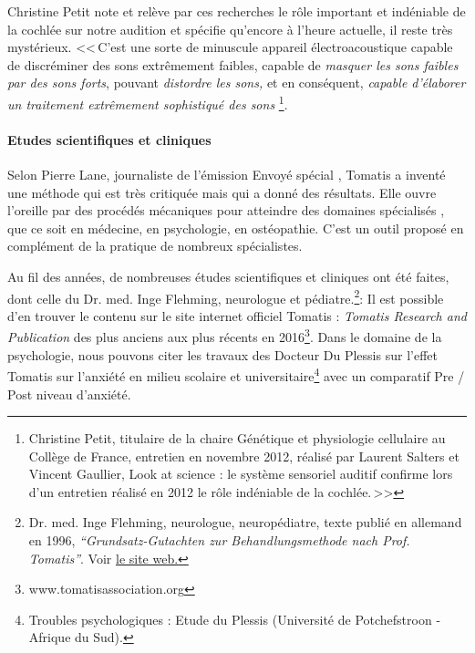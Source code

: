 Christine Petit note et relève par ces recherches le rôle important
et indéniable de la cochlée sur notre audition et spécifie qu'encore
à l'heure actuelle, il reste très mystérieux. 
<<\,C'est une sorte de minuscule appareil électroacoustique capable
de discréminer des sons extrêmement faibles, capable de \emph{masquer
les sons faibles par des sons forts}, pouvant \emph{distordre les
sons,} et en conséquent, \emph{capable d'élaborer un traitement extrêmement
sophistiqué des sons}%
\footnote{Christine Petit, titulaire de la chaire Génétique et
	physiologie cellulaire au Collège de France, entretien en novembre 2012, réalisé par Laurent Salters et Vincent Gaullier, Look at science : le système sensoriel auditif confirme lors d'un entretien réalisé en 2012 le rôle indéniable de la cochlée.\,>>}.


 \paragraph{Etudes scientifiques et cliniques}
 Selon Pierre Lane, journaliste de l'é\-mi\-s\-sion Envoyé spécial%
\autocite{tomatis_methode_1991}, Tomatis
a inventé une méthode qui est très critiquée mais qui a donné des
résultats. Elle ouvre l'oreille par des procédés mécaniques pour atteindre
des domaines spécialisés , que ce soit en médecine, en psychologie,
en ostéopathie. C'est un outil proposé
en complément de la pratique de nombreux spécialistes. 

Au fil des années, de nombreuses études scientifiques et cliniques
ont été faites, dont celle du Dr. med. Inge Flehming, neurologue et pédiatre.\footnote{Dr. med. Inge Flehming,
	neurologue, neuropédiatre, texte publié en allemand
	en 1996, \emph{``Grundsatz-Gutachten zur Behandlungsmethode
		nach Prof. Tomatis''}. Voir \href{http://www.analytische-hoertherapie.de/uploads/tx\_templavoila/Grundsatzgutachten\_zur\_Behandlungsmethode\_nach\_Prof.\_Tomatis.pdf}{le site web.}}:
 Il est possible d'en trouver le contenu sur le site
internet officiel Tomatis : \emph{Tomatis Research and Publication}  des plus
anciens aux plus récents en 2016\footnote{www.tomatisassociation.org}.
Dans le domaine de la psychologie, nous pouvons citer les travaux des Docteur Du Plessis sur l'effet
Tomatis sur l'anxiété en milieu scolaire et universitaire\footnote{Troubles psychologiques : Etude du Plessis (Université de Potchefstroon
- Afrique du Sud).} avec un comparatif Pre / Post niveau d'anxiété.


